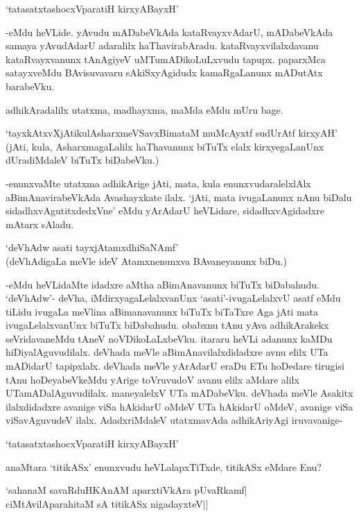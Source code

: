 \begin{shloka}
`tatasatxtashocxVparatiH kirxyABayxH'
\end{shloka}

-eMdu heVLide. yAvudu mADabeVkAda kataRvayxvAdarU, mADabeVkAda samaya yAvudAdarU adaralilx haThavirabAradu. kataRvayxvilalxdavanu kataRvayxvanunx tAnAgiyeV uMTumADikoLuLxvudu tapupx. paparxMca satayxveMdu BAvisuvavaru sAkiSxyAgidudx kamaRgaLanunx mADutAtx barabeVku.

adhikAradalilx utatxma, madhayxma, maMda eMdu mUru bage.

`tayxkAtxvXjAtikulAsharxmeVSavxBimataM muMcAyxtf sudUrAtf kirxyAH' (jAti, kula, AsharxmagaLalilx haThavanunx biTuTx elalx kirxyegaLanUnx dUradiMdaleV biTuTx biDabeVku.)

-enunxvaMte utatxma adhikArige jAti, mata, kula enunxvudaralelxlAlx aBimAnavirabeVkAda Avashayxkate ilalx. `jAti, mata ivugaLanunx nAnu biDalu sidadhxvAgutitxdedxVne' eMdu yArAdarU heVLidare, sidadhxvAgidadxre mAtarx sAladu.

\begin{shloka}
`deVhAdw asati tayxjAtamxdhiSaNAmf'\\
(deVhAdigaLa meVle ideV Atamxnenunxva BAvaneyanunx biDu.)
\end{shloka}

-eMdu heVLidaMte idadxre aMtha aBimAnavanunx biTuTx biDabahudu. `deVhAdw'- deVha, iMdirxyagaLelalxvanUnx `asati'-ivugaLelalxvU asatf eMdu tiLidu ivugaLa meVlina aBimanavanunx biTuTx biTaTxre Aga jAti mata ivugaLelalxvanUnx biTuTx biDabahudu. obabxnu tAnu yAva adhikArakekx seVridavaneMdu tAneV noVDikoLaLxbeVku. itararu heVLi adanunx kaMDu hiDiyalAguvudilalx. deVhada meVle aBimAnavilalxdidadxre avnu elilx UTa mADidarU tapipxlalx. deVhada meVle yArAdarU eraDu ETu hoDedare tirugisi tAnu hoDeyabeVkeMdu yArige toVruvudoV avanu elilx aMdare alilx UTamADalAguvudilalx. maneyalelxV UTa mADabeVku. deVhada meVle Asakitx ilalxdidadxre avanige viSa hAkidarU oMdeV UTa hAkidarU oMdeV, avanige viSa viSavAguvudeV ilalx. AdadxriMdaleV utatxmavAda adhikAriyAgi iruvavanige- 

\begin{shloka}
`tatasatxtashocxVparatiH kirxyABayxH'
\end{shloka}

anaMtara `titikASx' enunxvudu heVLalapxTiTxde, titikASx eMdare Enu?

\begin{shloka}
`sahanaM savaRduHKAnAM aparxtiVkAra pUvaRkamf|\\
ciMtAvilAparahitaM sA titikASx nigadayxteV||
\end{shloka}

